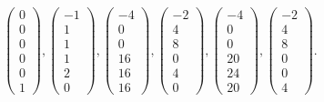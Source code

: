 \begin{gather*}
    \begin{pmatrix}
        0\\0\\0\\0\\0\\1
    \end{pmatrix},
    \begin{pmatrix}
        -1\\1\\1\\1\\2\\0
    \end{pmatrix},
    \begin{pmatrix}
        -4\\0\\0\\16\\16\\16
    \end{pmatrix},
    \begin{pmatrix}
        -2\\4\\8\\0\\4\\0
    \end{pmatrix},
    \begin{pmatrix}
        -4\\0\\0\\20\\24\\20
    \end{pmatrix},
    \begin{pmatrix}
        -2\\4\\8\\0\\0\\4
    \end{pmatrix}.
\end{gather*}\\


